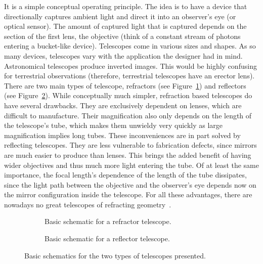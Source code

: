 It is a simple conceptual operating principle. The idea is to have a
device that directionally captures ambient light and direct it into an
observer's eye (or optical sensor). The amount of captured light that is
captured depends on the section of the first lens, the objective (think of a constant
stream of photons entering a bucket-like device). Telescopes come in
various sizes and shapes. As so many devices, telescopes vary with the
application the designer had in mind. Astronomical telescopes produce
inverted images. This would be highly confusing for terrestrial
observations (therefore, terrestrial telescopes have an erector lens).
There are two main types of telescope, refractors (see
Figure~\ref{fig:refractor_telescopes}) and reflectors (see
Figure~\ref{fig:reflector_telescopes}). While conceptually much simpler,
refraction based telescopes do have several drawbacks. They are
exclusively dependent on lenses, which are difficult to manufacture.
Their magnification also only depends on the length of the telescope's
tube, which makes them unwieldy very quickly as large magnification
implies long tubes. These inconveniences are in part solved by
reflecting telescopes. They are less vulnerable to fabrication defects,
since mirrors are much easier to produce than lenses. This brings the
added benefit of having wider objectives and thus much more light
entering the tube. Of at least the same importance, the focal length's
dependence of the length of the tube dissipates, since the light path
between the objective and the observer's eye depends now on the mirror
configuration inside the telescope. For all these advantages, there are
nowadays no great telescopes of refracting geometry~.

\begin{figure}
      \begin{subfigure}[b]{.45\linewidth}
        \centering
        \missingfigure{}
        \caption{Basic schematic for a refractor
        telescope.}\label{fig:refractor_telescopes}
      \end{subfigure}%
      \hfill
      \begin{subfigure}[b]{.45\linewidth}
        \centering
        \missingfigure{}
        \caption{Basic schematic for a reflector
        telescope.}\label{fig:reflector_telescopes}
      \end{subfigure}
      \caption{Basic schematics for the two types of telescopes
      presented.}\label{fig:telescope_types_schematics}
\end{figure}

